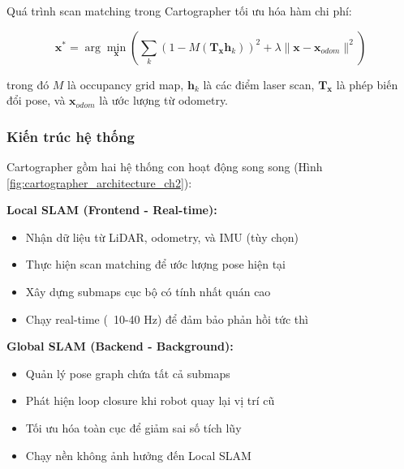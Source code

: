 Quá trình scan matching trong Cartographer tối ưu hóa hàm chi phí:

\begin{equation}
\mathbf{x}^* = \arg\min_{\mathbf{x}} \left( \sum_{k} (1 - M(\mathbf{T}_{\mathbf{x}} \mathbf{h}_k))^2 + \lambda \|\mathbf{x} - \mathbf{x}_{odom}\|^2 \right)
\label{eq:scan_matching}
\end{equation}

trong đó $M$ là occupancy grid map, $\mathbf{h}_k$ là các điểm laser scan, $\mathbf{T}_{\mathbf{x}}$ là phép biến đổi pose, và $\mathbf{x}_{odom}$ là ước lượng từ odometry.

\subsubsection{Kiến trúc hệ thống}

Cartographer gồm hai hệ thống con hoạt động song song (Hình \ref{fig:cartographer_architecture_ch2}):

\textbf{Local SLAM (Frontend - Real-time):}
\begin{itemize}
    \item Nhận dữ liệu từ LiDAR, odometry, và IMU (tùy chọn)
    \item Thực hiện scan matching để ước lượng pose hiện tại
    \item Xây dựng submaps cục bộ có tính nhất quán cao
    \item Chạy real-time (~10-40 Hz) để đảm bảo phản hồi tức thì
\end{itemize}

\textbf{Global SLAM (Backend - Background):}
\begin{itemize}
    \item Quản lý pose graph chứa tất cả submaps
    \item Phát hiện loop closure khi robot quay lại vị trí cũ
    \item Tối ưu hóa toàn cục để giảm sai số tích lũy
    \item Chạy nền không ảnh hưởng đến Local SLAM
\end{itemize}

